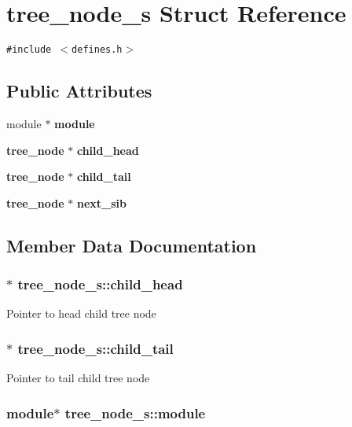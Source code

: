 \section{tree\_\-node\_\-s  Struct Reference}
\label{structtree__node__s}
{\tt \#include $<$defines.h$>$}

\subsection*{Public Attributes}
\begin{CompactItemize}
\item 
module $\ast$ {\bf module}
\item 
{\bf tree\_\-node} $\ast$ {\bf child\_\-head}
\item 
{\bf tree\_\-node} $\ast$ {\bf child\_\-tail}
\item 
{\bf tree\_\-node} $\ast$ {\bf next\_\-sib}
\end{CompactItemize}


\subsection{Member Data Documentation}
\subsubsection{$\ast$ tree\_\-node\_\-s::child\_\-head}\label{structtree__node__s_m1}


Pointer to head child tree node 
\subsubsection{$\ast$ tree\_\-node\_\-s::child\_\-tail}\label{structtree__node__s_m2}


Pointer to tail child tree node 
\subsubsection{\setlength{\rightskip}{0pt plus 5cm}module$\ast$ tree\_\-node\_\-s::module}\label{structtree__node__s_m0}


